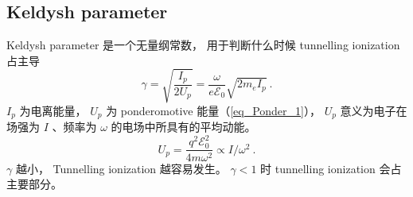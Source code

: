 
\begin{issues}
\issueDraft
\end{issues}


\subsection{Keldysh parameter}
Keldysh parameter 是一个无量纲常数， 用于判断什么时候 tunnelling ionization 占主导
\begin{equation}
\gamma = \sqrt{\frac{I_p}{2U_p}} = \frac{\omega}{e\mathcal E_0} \sqrt{2m_e I_p}~.
\end{equation}
$I_p$ 为电离能量， $U_p$ 为 ponderomotive 能量（\autoref{eq_Ponder_1}）， $U_p$ 意义为电子在场强为 $I$ 、频率为 $\omega$ 的电场中所具有的平均动能。
\begin{equation}
U_p = \frac{q^2 \mathcal E_0^2}{4m\omega^2} \propto I/\omega^2~.
\end{equation}
$\gamma$ 越小， Tunnelling ionization 越容易发生。 $\gamma < 1$ 时 tunnelling ionization 会占主要部分。

